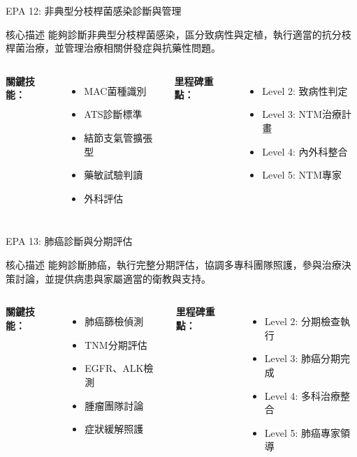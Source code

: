 \documentclass[aspectratio=169]{beamer}
\begin{document}
\begin{frame}{EPA 12: 非典型分枝桿菌感染診斷與管理}
\begin{alertblock}{核心描述}
能夠診斷非典型分枝桿菌感染，區分致病性與定植，執行適當的抗分枝桿菌治療，並管理治療相關併發症與抗藥性問題。
\end{alertblock}

\begin{columns}[c]
\textbf{關鍵技能：}
\begin{itemize}
\item MAC菌種識別
\item ATS診斷標準
\item 結節支氣管擴張型
\item 藥敏試驗判讀
\item 外科評估
\end{itemize}

\textbf{里程碑重點：}
\begin{itemize}
\item Level 2: 致病性判定
\item Level 3: NTM治療計畫
\item Level 4: 內外科整合
\item Level 5: NTM專家
\end{itemize}
\end{columns}
\end{frame}

\begin{frame}{EPA 13: 肺癌診斷與分期評估}
\begin{alertblock}{核心描述}
能夠診斷肺癌，執行完整分期評估，協調多專科團隊照護，參與治療決策討論，並提供病患與家屬適當的衛教與支持。
\end{alertblock}

\begin{columns}[c]
\textbf{關鍵技能：}
\begin{itemize}
\item 肺癌篩檢偵測
\item TNM分期評估
\item EGFR、ALK檢測
\item 腫瘤團隊討論
\item 症狀緩解照護
\end{itemize}

\textbf{里程碑重點：}
\begin{itemize}
\item Level 2: 分期檢查執行
\item Level 3: 肺癌分期完成
\item Level 4: 多科治療整合
\item Level 5: 肺癌專家領導
\end{itemize}
\end{columns}
\end{frame}
\end{document}

